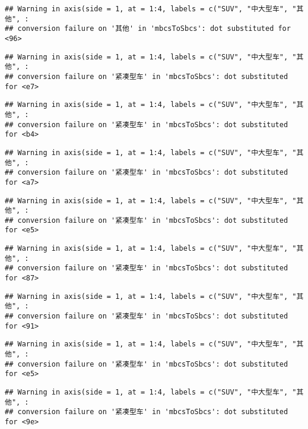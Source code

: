 \documentclass[]{article}
\begin{document}
\begin{verbatim}
## Warning in axis(side = 1, at = 1:4, labels = c("SUV", "中大型车", "其他", :
## conversion failure on '其他' in 'mbcsToSbcs': dot substituted for <96>
\end{verbatim}

\begin{verbatim}
## Warning in axis(side = 1, at = 1:4, labels = c("SUV", "中大型车", "其他", :
## conversion failure on '紧凑型车' in 'mbcsToSbcs': dot substituted for <e7>
\end{verbatim}

\begin{verbatim}
## Warning in axis(side = 1, at = 1:4, labels = c("SUV", "中大型车", "其他", :
## conversion failure on '紧凑型车' in 'mbcsToSbcs': dot substituted for <b4>
\end{verbatim}

\begin{verbatim}
## Warning in axis(side = 1, at = 1:4, labels = c("SUV", "中大型车", "其他", :
## conversion failure on '紧凑型车' in 'mbcsToSbcs': dot substituted for <a7>
\end{verbatim}

\begin{verbatim}
## Warning in axis(side = 1, at = 1:4, labels = c("SUV", "中大型车", "其他", :
## conversion failure on '紧凑型车' in 'mbcsToSbcs': dot substituted for <e5>
\end{verbatim}

\begin{verbatim}
## Warning in axis(side = 1, at = 1:4, labels = c("SUV", "中大型车", "其他", :
## conversion failure on '紧凑型车' in 'mbcsToSbcs': dot substituted for <87>
\end{verbatim}

\begin{verbatim}
## Warning in axis(side = 1, at = 1:4, labels = c("SUV", "中大型车", "其他", :
## conversion failure on '紧凑型车' in 'mbcsToSbcs': dot substituted for <91>
\end{verbatim}

\begin{verbatim}
## Warning in axis(side = 1, at = 1:4, labels = c("SUV", "中大型车", "其他", :
## conversion failure on '紧凑型车' in 'mbcsToSbcs': dot substituted for <e5>
\end{verbatim}

\begin{verbatim}
## Warning in axis(side = 1, at = 1:4, labels = c("SUV", "中大型车", "其他", :
## conversion failure on '紧凑型车' in 'mbcsToSbcs': dot substituted for <9e>
\end{verbatim}
\end{document}
